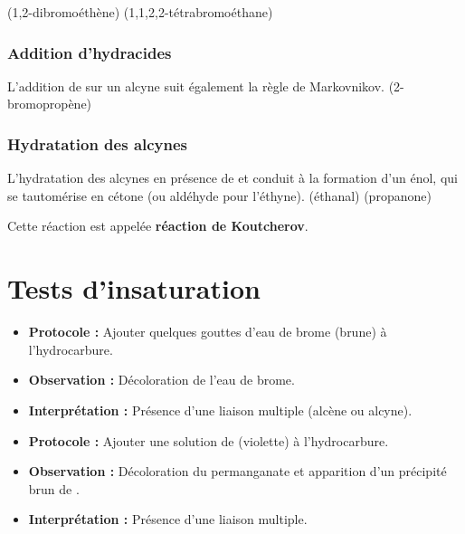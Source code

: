 \begin{exemple}
 (1,2-dibromoéthène)
 (1,1,2,2-tétrabromoéthane)
\end{exemple}

\subsubsection{Addition d'hydracides}

\begin{propriete}
L'addition de  sur un alcyne suit également la règle de Markovnikov.
 (2-bromopropène)
\end{propriete}

\subsubsection{Hydratation des alcynes}

\begin{experience}
L'hydratation des alcynes en présence de  et  conduit à la formation d'un énol, qui se tautomérise en cétone (ou aldéhyde pour l'éthyne).
 (éthanal)
 (propanone)
\end{experience}

\begin{remarque}
Cette réaction est appelée \textbf{réaction de Koutcherov}.
\end{remarque}

\section{Tests d'insaturation}

\begin{experience}
\begin{itemize}
    \item \textbf{Protocole :} Ajouter quelques gouttes d'eau de brome (brune) à l'hydrocarbure.
    \item \textbf{Observation :} Décoloration de l'eau de brome.
    \item \textbf{Interprétation :} Présence d'une liaison multiple (alcène ou alcyne).
\end{itemize}
\end{experience}

\begin{experience}
\begin{itemize}
    \item \textbf{Protocole :} Ajouter une solution de  (violette) à l'hydrocarbure.
    \item \textbf{Observation :} Décoloration du permanganate et apparition d'un précipité brun de .
    \item \textbf{Interprétation :} Présence d'une liaison multiple.
\end{itemize}
\end{experience}

